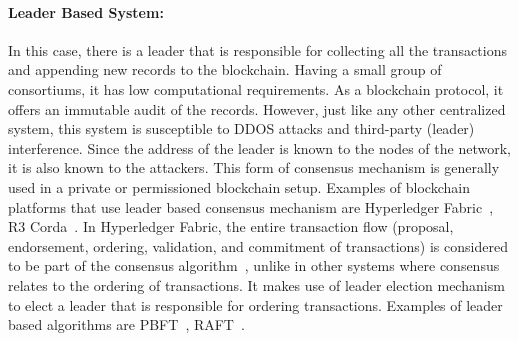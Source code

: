 \paragraph{Leader Based System:}In this case, there is a leader that is
responsible for collecting all the transactions and appending new records to
the blockchain. Having a small group of consortiums, it has low computational
requirements. As a blockchain protocol, it offers an immutable audit of the
records. However, just like any other centralized system, this system is
susceptible to DDOS attacks and third-party (leader) interference. Since the
address of the leader is known to the nodes of the network, it is also known to
the attackers. This form of consensus mechanism is generally used in a private
or permissioned blockchain setup. Examples of blockchain platforms that use
leader based consensus mechanism are Hyperledger
Fabric~\cite{androulaki2018hyperledger}, R3 Corda~\cite{brown2016corda}. In
Hyperledger Fabric, the entire transaction flow (proposal, endorsement,
ordering, validation, and commitment of transactions) is considered to be part
of the consensus algorithm~\cite{hyperledgerfabric,hyperledgerfabric2}, unlike
in other systems where consensus relates to the ordering of transactions. It
makes use of leader election mechanism to elect a leader that is responsible
for ordering transactions. Examples of leader based algorithms are
\ac{PBFT}~\cite{castro1999practical}, RAFT~\cite{ongaro2014search}. 

